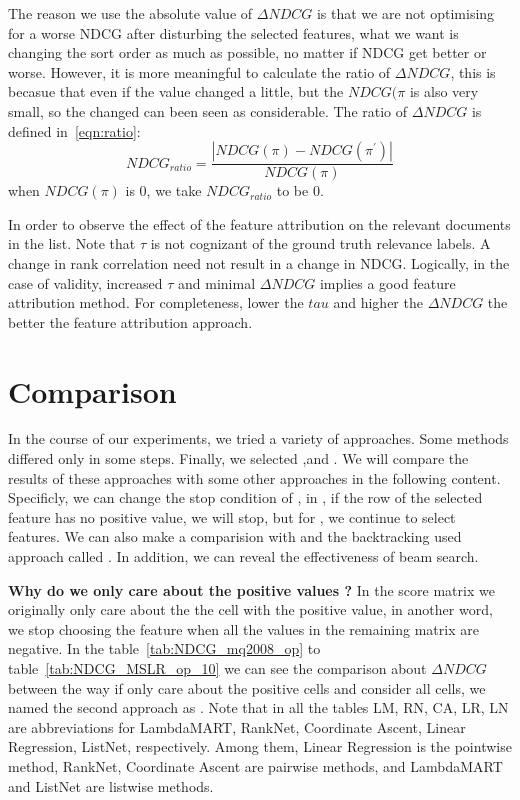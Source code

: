 The reason we use the absolute value of $\Delta NDCG$ is that we are not optimising for a worse NDCG after disturbing the selected features, what we want is changing the sort order as much as possible, no matter if NDCG get better or worse. However, it is more meaningful to calculate the ratio of $\Delta NDCG$, this is becasue that even if the value changed a little, but the $NDCG(\pi $ is also very small, so the changed can been seen as considerable. The ratio of $\Delta NDCG$ is defined in~\eqref{eqn:ratio}:
\begin{equation}
NDCG_{ratio} = \frac{\left | NDCG(\pi ) - NDCG(\pi ^{'})\right  |}{NDCG(\pi )}\label{eqn:ratio}
\end{equation}
when $NDCG(\pi)$ is 0, we take $NDCG_{ratio}$ to be 0.

In order to observe the effect of the feature attribution on the relevant documents in the list. Note that $\tau$ is not cognizant of the ground truth relevance labels. A change in rank correlation need not result in a change in NDCG. Logically, in the case of validity, increased $\tau$ and minimal $\Delta NDCG$ implies a good feature attribution method. For completeness, lower the $tau$ and higher the $\Delta NDCG$ the better the feature attribution approach. 


\section{Comparison}
In the course of our experiments, we tried a variety of approaches. Some methods differed only in some steps. Finally, we selected \greedy,\greedycov and \greedycovep. We will compare the results of these approaches with some other approaches in the following content. Specificly, we can change the stop condition of \greedycov, in \greedycov, if the row of the selected feature has no positive value, we will stop, but for \greedycovall, we continue to select features. We can also make a comparision with \greedy and the backtracking used approach called \greedyback. In addition, we can reveal the effectiveness of beam search. 

\textbf{
Why do we only care about the positive values ?}
In the score matrix we originally only care about the the cell with the positive value, in another word, we stop choosing the feature when all the values in the remaining matrix are negative. In the  table~\ref{tab:NDCG_mq2008_op} to table~\ref{tab:NDCG_MSLR_op_10} we can see the comparison about $\Delta NDCG$ between the way if only care about the positive cells and consider all cells, we named the second approach as \greedycovall. Note that in all the tables LM, RN, CA, LR, LN are abbreviations for LambdaMART, RankNet, Coordinate Ascent, Linear Regression, ListNet, respectively. Among them, Linear Regression is the pointwise method, RankNet, Coordinate Ascent are pairwise methods, and LambdaMART and ListNet are listwise methods.

